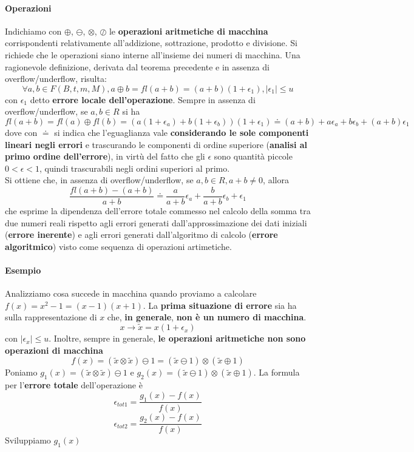 \documentclass[10pt]{book}
\begin{document}
\paragraph{Operazioni} Indichiamo con $\oplus$, $\ominus$, $\otimes$, $\oslash$ le \textbf{operazioni aritmetiche di macchina} corrispondenti relativamente all'addizione, sottrazione, prodotto e divisione. Si richiede che le operazioni siano interne all'insieme dei numeri di macchina. Una ragionevole definizione, derivata dal teorema precedente e in assenza di overflow/underflow, risulta: $$\forall a, b \in F(B, t, m, M), a \oplus b = fl(a + b) = (a + b)(1 + \epsilon_1), |\epsilon_1| \leq u$$ con $\epsilon_1$ detto  \textbf{errore locale dell'operazione}. Sempre in assenza di overflow/underflow, se $a, b \in R$ si ha $$fl(a + b) = fl(a)\oplus fl(b) = (a(1 + \epsilon_a) + b(1 + \epsilon_b))(1 + \epsilon_1) \doteq (a + b) + a\epsilon_a + b\epsilon_b + (a + b)\epsilon_1$$ dove con $\doteq$ si indica che l'eguaglianza vale \textbf{considerando le sole componenti lineari negli errori} e trascurando le componenti di ordine superiore (\textbf{analisi al primo ordine dell'errore}), in virtù del fatto che gli $\epsilon$ sono quantità piccole $0 < \epsilon < 1$, quindi trascurabili negli ordini superiori al primo.\\
Si ottiene che, in assenza di overflow/underflow, se $a, b \in R, a + b \neq 0$, allora $$\frac{fl(a + b) - (a + b)}{a + b} \doteq \frac{a}{a + b}\epsilon_a + \frac{b}{a + b}\epsilon_b + \epsilon_1$$ che esprime la dipendenza dell'errore totale commesso nel calcolo della somma tra due numeri reali rispetto agli errori generati dall'approssimazione dei dati iniziali (\textbf{errore inerente}) e agli errori generati dall'algoritmo di calcolo (\textbf{errore algoritmico}) visto come sequenza di operazioni artimetiche.\\
\pagebreak
\paragraph{Esempio}
Analizziamo cosa succede in macchina quando proviamo a calcolare $f(x) = x^2 - 1 = (x - 1)(x + 1)$. La \textbf{prima situazione di errore} sia ha sulla rappresentazione di $x$ che, \textbf{in generale}, \textbf{non è un numero di macchina}.$$x \rightarrow \tilde{x} = x(1 + \epsilon_x)$$ con $|\epsilon_x| \leq u$. Inoltre, sempre in generale, \textbf{le operazioni aritmetiche non sono operazioni di macchina} $$f(x) = (\tilde{x} \otimes \tilde{x}) \ominus 1 = (\tilde{x} \ominus 1)\otimes(\tilde{x} \oplus 1)$$Poniamo $g_1(x) = (\tilde{x} \otimes \tilde{x}) \ominus 1$ e $g_2(x) = (\tilde{x} \ominus 1)\otimes(\tilde{x} \oplus 1)$. La formula per l'\textbf{errore totale} dell'operazione è $$\epsilon_{tot1} = \frac{g_1(x) - f(x)}{f(x)}$$ $$\epsilon_{tot2} = \frac{g_2(x) - f(x)}{f(x)}$$ Sviluppiamo $g_1(x)$
\end{document}
